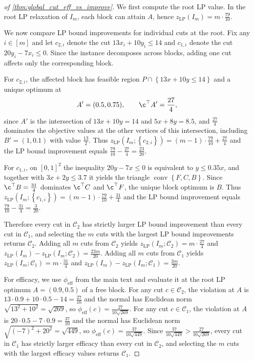 \documentclass[smallextended,envcountsect]{svjour3} %
\let\ACCc\c
\newcommand{\set}[1]{\left\{#1\right\}}
\renewcommand{\c}{\mathbf{c}}
\newcommand{\Ccal}{\mathcal{C}}
\newcommand{\0}{\mathbf{0}}
\DeclareMathOperator{\conv}{conv} %
\newcommand{\LP}{\mathrm{LP}}
\newcommand{\1}{\mathbf{1}} %
\let\c\ACCc
\begin{document}
\begin{proof}[of \cref{thm:global_cut_eff_vs_improve}]
	We first compute the root LP value.
	In the root LP relaxation of $I_m$, each block can attain $A$, hence $z_{\LP}(I_m)=m\cdot \frac{79}{10}$.

	We now compare LP bound improvements for individual cuts at the root.
	Fix any $i\in[m]$ and let $c_{2,i}$ denote the cut $13x_i+10y_i\le 14$ and $c_{1,i}$ denote the cut $20y_i-7x_i\le 0$.
	Since the instance decomposes across blocks, adding one cut affects only the corresponding block.

	For $c_{2,i}$, the affected block has feasible region $P\cap\set{13x+10y\le 14}$ and a unique optimum at
	\[
		A'=(0.5,0.75),
		\qquad
		\c^\top A'=\frac{27}{4},
	\]
	since $A'$ is the intersection of $13x+10y=14$ and $5x+8y=8.5$, and $\frac{27}{4}$ dominates the objective values at the other vertices of this intersection, including $B'=(1,0.1)$ with value $\frac{13}{2}$.
	Thus $z_{\LP}(I_m;\set{c_{2,i}})=(m-1)\cdot \frac{79}{10}+\frac{27}{4}$ and the LP bound improvement equals $\frac{79}{10}-\frac{27}{4}=\frac{23}{20}$.

	For $c_{1,i}$, on $[0,1]^2$ the inequality $20y-7x\le 0$ is equivalent to $y\le 0.35x$, and together with $3x+2y\le 3.7$ it yields the triangle $\conv\set{F,C,B}$.
	Since $\c^\top B=\frac{31}{4}$ dominates $\c^\top C$ and $\c^\top F$, the unique block optimum is $B$.
	Thus $z_{\LP}(I_m;\set{c_{1,i}})=(m-1)\cdot \frac{79}{10}+\frac{31}{4}$ and the LP bound improvement equals $\frac{79}{10}-\frac{31}{4}=\frac{3}{20}$.

	Therefore every cut in $\Ccal_2$ has strictly larger LP bound improvement than every cut in $\Ccal_1$, and selecting the $m$ cuts with the largest LP bound improvements returns $\Ccal_2$. Adding all $m$ cuts from $\Ccal_2$ yields $z_{\LP}(I_m;\Ccal_2)=m\cdot \frac{27}{4}$ and $z_{\LP}(I_m)-z_{\LP}(I_m;\Ccal_2)=\frac{23m}{20}$.
	Adding all $m$ cuts from $\Ccal_1$ yields $z_{\LP}(I_m;\Ccal_1)=m\cdot \frac{31}{4}$ and $z_{\LP}(I_m)-z_{\LP}(I_m;\Ccal_1)=\frac{3m}{20}$.

		For efficacy, we use $\phi_{\text{eff}}$ from the main text and evaluate it at the root LP optimum $A=(0.9,0.5)$ of a free block.
		For any cut $c\in\Ccal_2$, the violation at $A$ is $13\cdot 0.9+10\cdot 0.5-14=\frac{27}{10}$ and the normal has Euclidean norm $\sqrt{13^2+10^2}=\sqrt{269}$, so $\phi_{\text{eff}}(c)=\frac{27}{10\sqrt{269}}$.
		For any cut $c\in\Ccal_1$, the violation at $A$ is $20\cdot 0.5-7\cdot 0.9=\frac{37}{10}$ and the normal has Euclidean norm $\sqrt{(-7)^2+20^2}=\sqrt{449}$, so $\phi_{\text{eff}}(c)=\frac{37}{10\sqrt{449}}$.
		Since $\frac{37}{10\sqrt{449}}>\frac{27}{10\sqrt{269}}$, every cut in $\Ccal_1$ has strictly larger efficacy than every cut in $\Ccal_2$, and selecting the $m$ cuts with the largest efficacy values returns $\Ccal_1$.


\end{proof}
\end{document}
